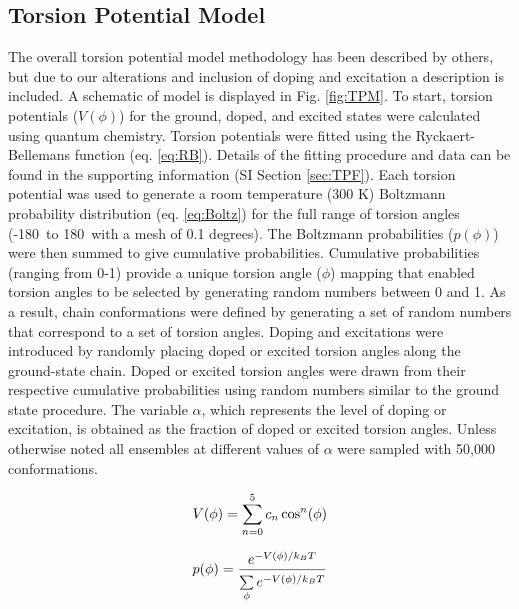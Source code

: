 \subsection{Torsion Potential Model} The overall torsion potential model methodology has been described by others,\cite{Zhang2014, Claudio2001} but due to our alterations and inclusion of doping and excitation a description is included. A schematic of model is displayed in Fig. \ref{fig:TPM}. To start, torsion potentials ($V(\phi)$) for the ground, doped, and excited states were calculated using quantum chemistry. Torsion potentials were fitted using the Ryckaert-Bellemans function (eq. \ref{eq:RB}). Details of the fitting procedure and data can be found in the supporting information (SI Section \ref{sec:TPF}). Each torsion potential was used to generate a room temperature (300 K) Boltzmann probability distribution (eq. \ref{eq:Boltz}) for the full range of torsion angles (-180\textdegree \ to 180\textdegree \ with a mesh of 0.1 degrees). The Boltzmann probabilities ($p(\phi)$) were then summed to give cumulative probabilities. Cumulative probabilities (ranging from 0-1) provide a unique torsion angle ($\phi$) mapping that enabled torsion angles to be selected by generating random numbers between 0 and 1. As a result, chain conformations were defined by generating a set of random numbers that correspond to a set of torsion angles. Doping and excitations were introduced by randomly placing doped or excited torsion angles along the ground-state chain. Doped or excited torsion angles were drawn from their respective cumulative probabilities using random numbers similar to the ground state procedure. The variable $\alpha$, which represents the level of doping or excitation, is obtained as the fraction of doped or excited torsion angles. Unless otherwise noted all ensembles at different values of $\alpha$ were sampled with 50,000 conformations.

\begin{equation}
\label{eq:RB}
\Large
V(\phi) = \sum_{n=0}^{5} c_n \cos^n(\phi)
\end{equation}

\begin{equation}
\label{eq:Boltz}
\Large
p(\phi) = \frac{e^{-V(\phi)/{k_BT}}}{\sum\limits_{\phi}^{}e^{-V(\phi)/{k_BT}}}
\end{equation}

